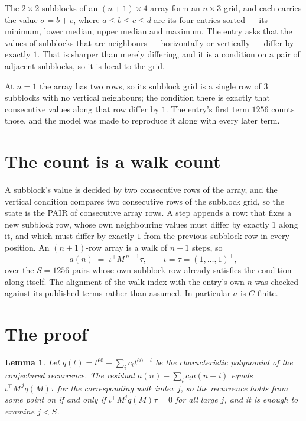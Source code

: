 \documentclass[11pt,a4paper]{article}
\theoremstyle{plain}
\newtheorem{lemma}[theorem]{Lemma}
\theoremstyle{definition}
\begin{document}
The $2\times2$ subblocks of an $(n+1)\times4$ array form an
$n\times3$ grid, and each carries the value $\sigma=b+c$, where $a\le b\le c\le d$ are its four entries sorted --- its minimum, lower median, upper median and maximum. The entry asks that the values of
subblocks that are neighbours --- horizontally or vertically --- differ by exactly $1$.
That is sharper than merely differing, and it is a condition on a pair of adjacent subblocks,
so it is local to the grid.

At $n=1$ the array has two rows, so its subblock grid is a single row of $3$ subblocks with
no vertical neighbours; the condition there is exactly that consecutive values along that row
differ by $1$. The entry's first term $1256$ counts those, and the model was made to
reproduce it along with every later term.

\section{The count is a walk count}

A subblock's value is decided by two consecutive rows of the array, and the
vertical condition compares two consecutive rows of the subblock grid, so the state is the
PAIR of consecutive array rows. A step appends a row: that fixes a new subblock row, whose own
neighbouring values must differ by exactly $1$ along it, and which must differ by exactly
$1$ from the previous subblock row in every position. An $(n+1)$-row array is a walk of
$n-1$ steps, so
\[
a(n)\;=\;\iota^{\!\top}M^{\,n-1}\tau,\qquad\iota=\tau=(1,\dots,1)^{\!\top},
\]
over the $S=1256$ pairs whose own subblock row already satisfies the condition along itself.
The alignment of the walk index with the entry's own $n$ was checked against its published
terms rather than assumed. In particular $a$ is $C$-finite.

\section{The proof}

\begin{lemma}\label{lem:crit}
Let $q(t)=t^{60}-\sum_i c_it^{60-i}$ be the characteristic polynomial of the
conjectured recurrence. The residual $a(n)-\sum_ic_ia(n-i)$ equals
$\iota^{\!\top}M^{\,j}q(M)\tau$ for the corresponding walk index $j$, so the recurrence
holds from some point on if and only if $\iota^{\!\top}M^{j}q(M)\tau=0$ for all large $j$,
and it is enough to examine $j<S$.
\end{lemma}
\end{document}
